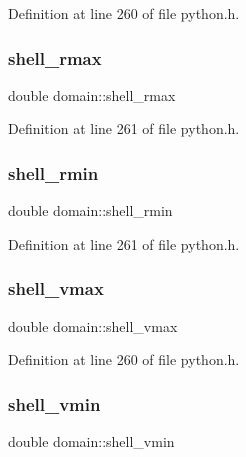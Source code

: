 Definition at line 260 of file python.\+h.

\mbox{\label{structdomain_aaba4c028c0288f52e5b717abc3a8f5ec}} 
\subsubsection{\texorpdfstring{shell\+\_\+rmax}{shell\_rmax}}
{\footnotesize\ttfamily double domain\+::shell\+\_\+rmax}



Definition at line 261 of file python.\+h.

\mbox{\label{structdomain_abb11bd3034be69e7a6bb8673b2bf4f3b}} 
\subsubsection{\texorpdfstring{shell\+\_\+rmin}{shell\_rmin}}
{\footnotesize\ttfamily double domain\+::shell\+\_\+rmin}



Definition at line 261 of file python.\+h.

\mbox{\label{structdomain_afe245787b302fa68acbaad6338a652f3}} 
\subsubsection{\texorpdfstring{shell\+\_\+vmax}{shell\_vmax}}
{\footnotesize\ttfamily double domain\+::shell\+\_\+vmax}



Definition at line 260 of file python.\+h.

\mbox{\label{structdomain_a7f85fa84808d259d99df40cea538974b}} 
\subsubsection{\texorpdfstring{shell\+\_\+vmin}{shell\_vmin}}
{\footnotesize\ttfamily double domain\+::shell\+\_\+vmin}



